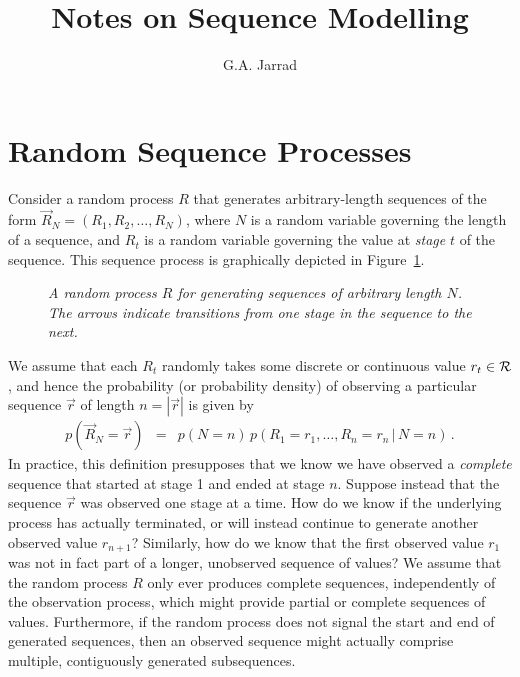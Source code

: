 \documentclass[a4paper]{article}
\title{Notes on Sequence Modelling}
\author{G.A. Jarrad}
\begin{document}
\maketitle
{}
\section{Random Sequence Processes}
\label{sec:random-processes}
Consider a random process $R$ that generates arbitrary-length sequences
of the form $\vec{R}_N=(R_1,R_2,\ldots,R_N)$, where $N$ is a random variable governing
the length of a sequence, and $R_t$ is a random variable governing the value at {\em stage} $t$
of the sequence. This sequence process is graphically depicted in Figure~\ref{fig:R-process}.
\begin{figure}[hbt]
\centering
{}
\caption{\em A random process $R$ for generating sequences of arbitrary length $N$. The arrows indicate transitions from one stage in the sequence to the next.}
\label{fig:R-process}
\end{figure}

We assume that each $R_t$ randomly takes some discrete or continuous value $r_t\in{\cal R}$,
and hence the probability (or probability density) of observing a particular
sequence $\vec{r}$ of length $n=|\vec{r}|$ is given by
\begin{eqnarray}
   p(\vec{R}_N\!=\!\vec{r}) & = & p(N=n)\,p(R_1\!=\!r_1,\ldots,R_n\!=\!r_n\,|\,N=n)\,.
\end{eqnarray}
In practice, this definition presupposes that we know we have observed a {\em complete} sequence that started
at stage 1 and ended at stage $n$.
Suppose instead that the sequence $\vec{r}$ was observed one stage at a time. How do we know if the
underlying process has actually terminated, or will instead
continue to generate another observed value $r_{n+1}$? 
Similarly, how do we know that the first observed value $r_1$ was not in fact
part of a longer, unobserved sequence of values?
We assume that the random process $R$ only ever produces complete sequences,
independently of the observation process, which might provide partial or complete sequences of values.
Furthermore, if the random process does not signal the start and end of generated sequences,
then an observed sequence might actually comprise multiple, contiguously generated subsequences.
\end{document}
